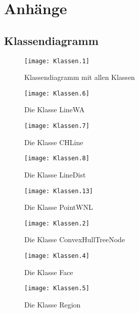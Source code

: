 \begin{appendix} \label{anhang}
\part*{Anhänge}
\adjustptc[-2]
\parttoc

   
 
 \chapter{Klassendiagramm}
 \begin{landscape}
 
 \begin{figure}	
	\texttt{[image: Klassen.1]}
	\caption{Klassendiagramm mit allen Klassen}
	\label{fig:UML_Klassendiagramm}
\end{figure}

\end{landscape}
 \begin{figure}	
	\texttt{[image: Klassen.6]}
	\caption{Die Klasse LineWA}
	\label{fig:UML_LineWA}
\end{figure}

 \begin{figure}	
	\texttt{[image: Klassen.7]}
	\caption{Die Klasse CHLine}
	\label{fig:UML_CHLine}
\end{figure}

 \begin{figure}	
	\texttt{[image: Klassen.8]}
	\caption{Die Klasse LineDist}
	\label{fig:UML_LineDist}
\end{figure}

 \begin{figure}	
	\texttt{[image: Klassen.13]}
	\caption{Die Klasse PointWNL}
	\label{fig:UML_PWNL}
\end{figure}

 \begin{figure}	
	\texttt{[image: Klassen.2]}
	\caption{Die Klasse ConvexHullTreeNode}
	\label{fig:UML_CHTN}
\end{figure}


 \begin{figure}	
	\texttt{[image: Klassen.4]}
	\caption{Die Klasse Face}
	\label{fig:UML_Face}
\end{figure}

 \begin{figure}	
	\texttt{[image: Klassen.5]}
	\caption{Die Klasse Region}
	\label{fig:UML_Region}
\end{figure}


\end{appendix}
